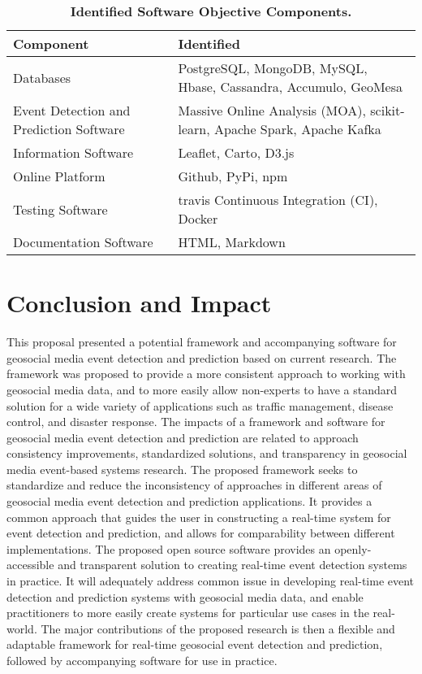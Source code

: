 \begin{table}[!htb]
\centering
\caption{\textbf{Identified Software Objective Components.}}
\label{table:softwarecomponents}
\begin{tabular}{|p{2.5in}|p{3.5in}|}
\hline
\textbf{Component} & \textbf{Identified}\\
\hline
Databases & PostgreSQL, MongoDB, MySQL, Hbase, Cassandra, Accumulo, GeoMesa\\
\hline
Event Detection and Prediction Software & Massive Online Analysis (MOA), scikit-learn, Apache Spark, Apache Kafka\\
\hline
Information Software & Leaflet, Carto, D3.js\\
\hline
Online Platform & Github, PyPi, npm\\
\hline
Testing Software & travis Continuous Integration (CI), Docker\\
\hline
Documentation Software & HTML, Markdown\\
\hline
\end{tabular}
\end{table}




\section{Conclusion and Impact} \label{conclusion-and-impact}

This proposal presented a potential framework and accompanying software for geosocial media event detection and prediction based on current research. The framework was proposed to provide a more consistent approach to working with geosocial media data, and to more easily allow non-experts to have a standard solution for a wide variety of applications such as traffic management, disease control, and disaster response. The impacts of a framework and software for geosocial media event detection and prediction are related to approach consistency improvements, standardized solutions, and transparency in geosocial media event-based systems research. The proposed framework seeks to standardize and reduce the inconsistency of approaches in different areas of geosocial media event detection and prediction applications. It provides a common approach that guides the user in constructing a real-time system for event detection and prediction, and allows for comparability between different implementations. The proposed open source software provides an openly-accessible and transparent solution to creating real-time event detection systems in practice. It will adequately address common issue in developing real-time event detection and prediction systems with geosocial media data, and enable practitioners to more easily create systems for particular use cases in the real-world. The major contributions of the proposed research is then a flexible and adaptable framework for real-time geosocial event detection and prediction, followed by accompanying software for use in practice.

